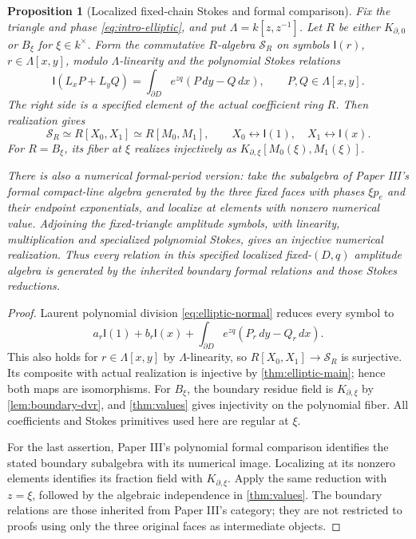 \documentclass[11pt]{article}
\numberwithin{equation}{section}
\newtheorem{proposition}[proposition]{Proposition}
\theoremstyle{definition}
\theoremstyle{remark}
\begin{document}
\begin{proposition}[Localized fixed-chain Stokes and formal comparison]
\label{prop:localized-formal-comparison}
Fix the triangle and phase \eqref{eq:intro-elliptic}, and put
$\Lambda=k[z,z^{-1}]$. Let $R$ be either $K_{\partial,0}$ or $B_\xi$
for $\xi\in k^\times$. Form the commutative $R$-algebra $\mathscr S_R$
on symbols $\mathsf I(r)$, $r\in\Lambda[x,y]$, modulo
$\Lambda$-linearity and the polynomial Stokes relations
\[
 \mathsf I(L_xP+L_yQ)
   =\int_{\partial D}e^{zq}(P\,dy-Q\,dx),
 \qquad P,Q\in\Lambda[x,y].
\]
The right side is a specified element of the actual coefficient ring $R$.
Then realization gives
\[
 \mathscr S_R\simeq R[X_0,X_1]\simeq R[M_0,M_1],
 \qquad X_0\longleftrightarrow\mathsf I(1),\quad
        X_1\longleftrightarrow\mathsf I(x).
\]
For $R=B_\xi$, its fiber at $\xi$ realizes injectively as
$K_{\partial,\xi}[M_0(\xi),M_1(\xi)]$.

There is also a numerical formal-period version: take the subalgebra of
Paper III's formal compact-line algebra generated by the three fixed
faces with phases $\xi p_e$ and their endpoint exponentials, and localize
at elements with nonzero numerical value. Adjoining the fixed-triangle
amplitude symbols, with linearity, multiplication and specialized
polynomial Stokes, gives an injective numerical realization. Thus every
relation in this specified localized fixed-$(D,q)$ amplitude algebra is
generated by the inherited boundary formal relations and those Stokes
reductions.
\end{proposition}
\begin{proof}
Laurent polynomial division \eqref{eq:elliptic-normal} reduces every
symbol to
\[
 a_r\mathsf I(1)+b_r\mathsf I(x)
       +\int_{\partial D}e^{zq}(P_r\,dy-Q_r\,dx).
\]
This also holds for $r\in\Lambda[x,y]$ by $\Lambda$-linearity, so
$R[X_0,X_1]\to\mathscr S_R$ is surjective. Its composite with actual
realization is injective by \cref{thm:elliptic-main}; hence both maps
are isomorphisms. For $B_\xi$, the boundary residue field is
$K_{\partial,\xi}$ by \cref{lem:boundary-dvr}, and
\cref{thm:values} gives injectivity on the polynomial fiber.
All coefficients and Stokes primitives used here are regular at $\xi$.

For the last assertion, Paper III's polynomial formal comparison
\cite[main theorem]{PaperIII} identifies the stated boundary subalgebra
with its numerical image. Localizing at its nonzero elements identifies
its fraction field with $K_{\partial,\xi}$. Apply the same reduction
with $z=\xi$, followed by the algebraic independence in
\cref{thm:values}. The boundary relations are those inherited from
Paper III's category; they are not restricted to proofs using only the
three original faces as intermediate objects.
\end{proof}
\end{document}
